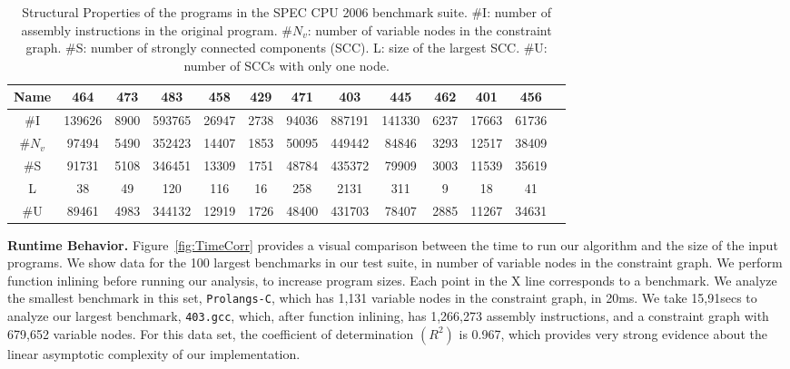 \documentclass{llncs}
\begin{document}
\begin{table}[htdp]
\begin{center}
\begin{scriptsize}
\renewcommand{\tabcolsep}{0.1cm}
\begin{tabular}{|c|c|c|c|c|c|c|c|c|c|c|c|c|} \hline
Name	    & 464 &	473 & 483 & 458 & 429 & 471 & 403 & 445 & 462 & 401 & 456 \\ \hline
\#I  & 139626 & 8900 & 593765 & 26947 & 2738 & 94036 & 887191 & 141330 &  6237 & 17663 & 61736 \\ \hline
\#$N_v$ & 97494 & 5490 & 352423 & 14407 & 1853	 & 50095 & 449442 & 84846 & 3293 & 12517 & 38409 \\ \hline
\#S  & 91731 & 5108 & 346451 & 13309 & 1751 & 48784 & 435372 & 79909 & 3003 & 11539 & 35619 \\ \hline
L    & 38 & 49 & 120 & 116 & 16 & 258 & 2131 & 311 & 9 & 18 & 41  \\ \hline
\#U  & 89461 & 4983 & 344132 & 12919 & 1726 & 48400 & 431703 & 78407 & 2885 & 11267 & 34631 \\ \hline
\end{tabular}
\end{scriptsize}
\end{center}
\caption{\label{tab:struct}Structural Properties of the programs in the SPEC CPU
2006 benchmark suite.
\#I: number of assembly instructions in the original program.
\#$N_v$: number of variable nodes in the constraint graph.
\#S: number of strongly connected components (SCC).
L: size of the largest SCC.
\#U: number of SCCs with only one node.}
\end{table}%



\noindent
\textbf{Runtime Behavior.}
Figure~\ref{fig:TimeCorr} provides a visual comparison between the time to
run our algorithm and the size of the input programs.
We show data for the 100 largest benchmarks in our test suite, in number
of variable nodes in the constraint graph.
We perform function inlining before running our analysis, to increase program
sizes.
Each point in the X line corresponds to a benchmark.
We analyze the smallest benchmark in this set, \texttt{Prolangs-C}, which has
1,131 variable nodes in the constraint graph, in 20ms.
We take 15,91secs to analyze our largest benchmark, \texttt{403.gcc}, which,
after function inlining, has 1,266,273 assembly instructions, and a
constraint graph with 679,652 variable nodes.
For this data set, the coefficient of determination $(R^2)$ is 0.967, which
provides very strong evidence about the linear asymptotic complexity of our
implementation.
\end{document}
